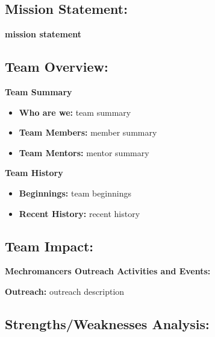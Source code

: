 \subsection*{\textbf{\Huge Mission Statement:}}
\vspace{.2cm}
\setlength{\parindent}{.25in} 


\textbf{mission statement}

\subsection*{\textbf{\Huge Team Overview:}}
\vspace{.2cm}
\setlength{\parindent}{.25in} 

\textbf{\Large Team Summary}

\begin{itemize}
 \item \textbf{Who are we:} team summary
 \item \textbf{Team Members:} member summary
 \item \textbf{Team Mentors:} mentor summary
\end{itemize}

\setlength{\parindent}{0.0in} 
\textbf{\Large Team History}
\setlength{\parindent}{.25in} 

\begin{itemize}
\item \textbf{Beginnings:} team beginnings
\item \textbf{Recent History:} recent history
\end{itemize}

\clearpage
{}
\subsection*{\textbf{\Huge Team Impact:}}
\vspace{.2cm}
\setlength{\parindent}{.25in} 

\textbf{\Large Mechromancers Outreach Activities and Events:}

\textbf{Outreach:} outreach description 

 

\subsection*{\textbf{\Huge Strengths/Weaknesses Analysis:}}
\vspace{.2cm}
\setlength{\parindent}{.25in} 

